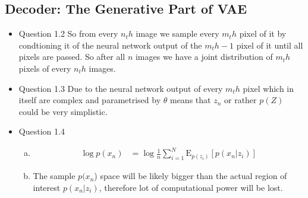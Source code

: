 \documentclass{article}
\begin{document}
  \subsection{Decoder: The Generative Part of VAE}
    \begin{itemize}
      \item Question 1.2 So from every $n_th$ image we sample every $m_th$ pixel of it by condtioning it of the neural network output of the $m_th -1$ pixel of it until all pixels are passed. So after all $n$ images we have a joint distribution of $m_th$ pixels of every $n_th$ images. 
      \item Question 1.3 Due to the neural network output of every $m_th$ pixel which in itself are complex and parametrised by $\theta$ means that $z_n$ or rather $p(Z)$ could be very simplistic. 
      \item Question 1.4 
      \begin{enumerate}[(a)]
        \item 
        \begin{align*}
          \log p(x_n) &=  \log \frac{1}{n} \sum_{i = 1}^{N} \mathrm{E}_{p(z_i)} [p(x_n|z_i)]
        \end{align*}
        \item The sample $p(x_n$) space will be likely bigger than the actual region of interest $p(x_n|z_i)$, therefore lot of computational power will be lost. 
      \end{enumerate}
    \end{itemize}
\end{document}
